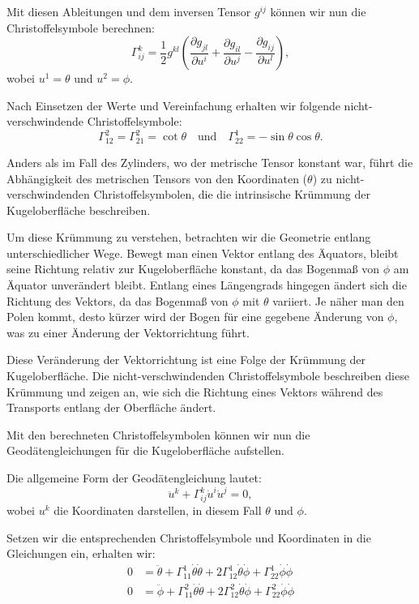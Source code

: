 Mit diesen Ableitungen und dem inversen Tensor $g^{ij}$ können wir nun die Christoffelsymbole berechnen:
\begin{equation}
	\Gamma_{ij}^k = \frac{1}{2} g^{kl} \left( \frac{\partial g_{jl}}{\partial u^i} + \frac{\partial g_{il}}{\partial u^j} - \frac{\partial g_{ij}}{\partial u^l} \right),
\end{equation}
wobei $u^1 = \theta$ und $u^2 = \phi$.

Nach Einsetzen der Werte und Vereinfachung erhalten wir folgende nicht-verschwindende Christoffelsymbole:
\begin{equation}
	\Gamma_{12}^2 = \Gamma_{21}^2 = \cot\theta \quad \text{und} \quad \Gamma_{22}^1 = -\sin\theta \cos\theta.
\end{equation}

Anders als im Fall des Zylinders, wo der metrische Tensor konstant war, führt die Abhängigkeit des metrischen Tensors von den Koordinaten ($\theta$) zu nicht-verschwindenden Christoffelsymbolen, die die intrinsische Krümmung der Kugeloberfläche beschreiben.

Um diese Krümmung zu verstehen, betrachten wir die Geometrie entlang unterschiedlicher Wege.
Bewegt man einen Vektor entlang des Äquators, bleibt seine Richtung relativ zur Kugeloberfläche konstant, da das Bogenmaß von $\phi$ am Äquator unverändert bleibt.
Entlang eines Längengrads hingegen ändert sich die Richtung des Vektors, da das Bogenmaß von $\phi$ mit $\theta$ variiert.
Je näher man den Polen kommt, desto kürzer wird der Bogen für eine gegebene Änderung von $\phi$, was zu einer Änderung der Vektorrichtung führt.

Diese Veränderung der Vektorrichtung ist eine Folge der Krümmung der Kugeloberfläche.
Die nicht-verschwindenden Christoffelsymbole beschreiben diese Krümmung und zeigen an, wie sich die Richtung eines Vektors während des Transports entlang der Oberfläche ändert.

Mit den berechneten Christoffelsymbolen können wir nun die Geodätengleichungen für die Kugeloberfläche aufstellen.

Die allgemeine Form der Geodätengleichung lautet:
\begin{equation}
	\ddot{u}^k + \Gamma^k_{ij} \dot{u}^i \dot{u}^j = 0,
\end{equation}
wobei $u^k$ die Koordinaten darstellen, in diesem Fall $\theta$ und $\phi$.

Setzen wir die entsprechenden Christoffelsymbole und Koordinaten in die Gleichungen ein, erhalten wir:
\begin{equation}
	\begin{aligned} 
		0 &= \ddot{\theta} + \Gamma^1_{11} \dot{\theta} \dot{\theta} + 2\Gamma^1_{12} \dot{\theta}\dot{\phi} + \Gamma^1_{22} \dot{\phi} \dot{\phi} \\
		0 &= \ddot{\phi} + \Gamma^2_{11} \dot{\theta} \dot{\theta} + 2\Gamma^2_{12} \dot{\theta}\dot{\phi} + \Gamma^2_{22} \dot{\phi} \dot{\phi}
	\end{aligned}
\end{equation}

